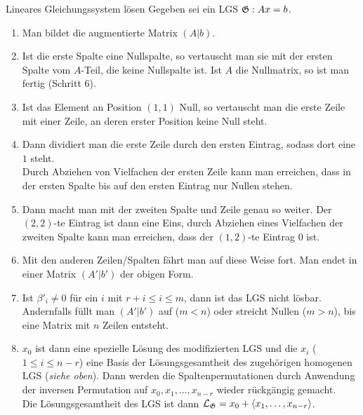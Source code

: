 \begin{Prozedur}{Lineares Gleichungssystem lösen}
    Gegeben sei ein LGS $\mathfrak{G}: Ax = b$.
    \begin{enumerate}
        \item Man bildet die augmentierte Matrix $(A|b)$.

        \item Ist die erste Spalte eine Nullspalte, so vertauscht man sie mit
        der ersten Spalte vom $A$-Teil, die keine Nullspalte ist.
        Ist $A$ die Nullmatrix, so ist man fertig (Schritt 6).

        \item Ist das Element an Position $(1, 1)$ Null, so vertauscht man die
        erste Zeile mit einer Zeile, an deren erster Position keine Null steht.

        \item Dann dividiert man die erste Zeile durch den ersten
        Eintrag, sodass dort eine $1$ steht. \\
        Durch Abziehen von Vielfachen der ersten Zeile kann man
        erreichen, dass in der ersten Spalte bis auf den ersten Eintrag nur
        Nullen stehen.

        \item Dann macht man mit der zweiten Spalte und Zeile genau so weiter.
        Der $(2, 2)$-te Eintrag ist dann eine Eins, durch Abziehen
        eines Vielfachen der zweiten Spalte kann man erreichen, dass der
        $(1, 2)$-te Eintrag $0$ ist.

        \item Mit den anderen Zeilen/Spalten fährt man auf diese Weise fort.
        Man endet in einer Matrix $(A'|b')$ der obigen Form.

        \item Ist $\beta'_i \not= 0$ für ein $i$ mit $r + i \le i \le m$, dann
        ist das LGS nicht lösbar.
        Andernfalls füllt man $(A'|b')$ auf ($m < n$) oder streicht Nullen
        ($m > n$), bis eine Matrix mit $n$ Zeilen entsteht.

        \item $x_0$ ist dann eine spezielle Lösung des modifizierten LGS
        und die $x_i$ ($1 \le i \le n - r$) eine Basis der Lösungsgesamtheit
        des zugehörigen homogenen LGS (\emph{siehe oben}).
        Dann werden die Spaltenpermutationen durch Anwendung der inversen
        Permutation auf $x_0, x_1, \ldots, x_{n-r}$ wieder rückgängig
        gemacht. \\
        Die Lösungsgesamtheit des LGS  ist dann
        $\mathcal{L}_{\mathfrak{G}} = x_0 + \langle x_1, \ldots, x_{n-r} \rangle$.
    \end{enumerate}
\end{Prozedur}


